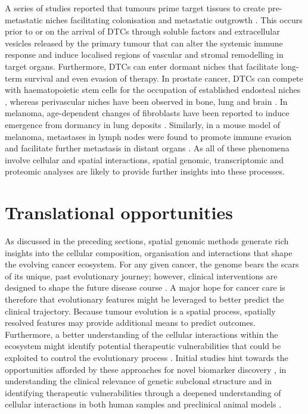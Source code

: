 A series of studies reported that tumours prime target tissues to create pre-metastatic niches facilitating colonisation and metastatic outgrowth \parencite{Peinado2017-hz}. This occurs prior to or on the arrival of \acp{DTC} through soluble factors and extracellular vesicles released by the primary tumour that can alter the systemic immune response and induce localised regions of vascular and stromal remodelling in target organs. Furthermore, \acp{DTC} can enter dormant niches that facilitate long-term survival and even evasion of therapy. In prostate cancer, \acp{DTC} can compete with haematopoietic stem cells for the occupation of established endosteal niches \parencite{Shiozawa2011-cm}, whereas perivascular niches have been observed in bone, lung and brain \parencite{Kienast2010-ur,Ghajar2013-id}. In melanoma, age-dependent changes of fibroblasts have been reported to induce emergence from dormancy in lung deposits \parencite{Fane2022-sd}. Similarly, in a mouse model of melanoma, metastases in lymph nodes were found to promote immune evasion and facilitate further metastasis in distant organs \parencite{Reticker-Flynn2022-ho}. As all of these phenomena involve cellular and spatial interactions, spatial genomic, transcriptomic and proteomic analyses are likely to provide further insights into these processes.

\section{Translational opportunities}
As discussed in the preceding sections, spatial genomic methods generate rich insights into the cellular composition, organisation and interactions that shape the evolving cancer ecosystem. For any given cancer, the genome bears the scars of its unique, past evolutionary journey; however, clinical interventions are designed to shape the future disease course . A major hope for cancer care is therefore that evolutionary features might be leveraged to better predict the clinical trajectory. Because tumour evolution is a spatial process, spatially resolved features may provide additional means to predict outcomes. Furthermore, a better understanding of the cellular interactions within the ecosystem might identify potential therapeutic vulnerabilities that could be exploited to control the evolutionary process \parencite{Andersson2021-pu,Moncada2020-ck,Ji2020-gn,Van_Maldegem2021-ta,Moldoveanu2022-qu}. Initial studies hint towards the opportunities afforded by these approaches for novel biomarker discovery \parencite{Danenberg2022-zb,Keren2018-or, Moldoveanu2022-qu}, in understanding the clinical relevance of genetic subclonal structure \parencite{Zhao2022-xd,Lomakin2022-ks,Erickson2022-zh} and in identifying therapeutic vulnerabilities through a deepened understanding of cellular interactions in both human samples \parencite{Moncada2020-ck,Ji2020-gn,Keren2018-or} and preclinical animal models \parencite{Dhainaut2022-nj}.

